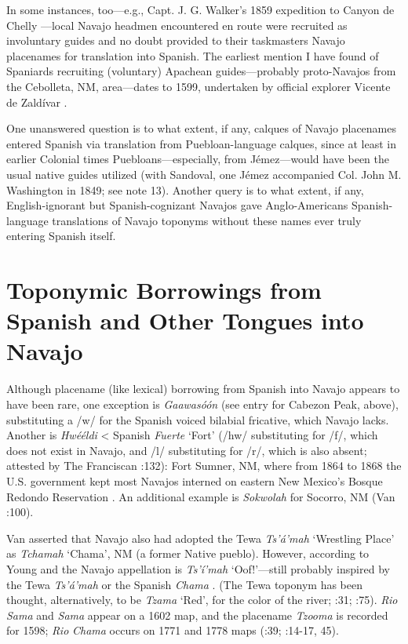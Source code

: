   In some instances, too—e.g., Capt. J. G. Walker’s 1859 expedition to Canyon de Chelly \citep[38]{Bailey1964a}—local Navajo headmen encountered en route were recruited as involuntary guides and no doubt provided to their taskmasters Navajo placenames for translation into Spanish.  The earliest mention I have found of Spaniards recruiting (voluntary) Apachean guides—probably proto-Navajos from the Cebolleta, NM, area—dates to 1599, undertaken by official explorer Vicente de Zaldívar \citep[306]{Reeve1956}.

  One unanswered question is to what extent, if any, calques of Navajo placenames entered Spanish via translation from Puebloan-language calques, since at least in earlier Colonial times Puebloans—especially, from Jémez—would have been the usual native guides utilized (with Sandoval, one Jémez accompanied Col. John M. Washington in 1849; see note 13).  Another query is to what extent, if any, English-ignorant but Spanish-cognizant Navajos gave Anglo-Americans Spanish-language translations of Navajo toponyms without these names ever truly entering Spanish itself.

\section{\textbf{Toponymic} \textbf{Borrowings} \textbf{from} \textbf{Spanish} \textbf{and} \textbf{Other} \textbf{Tongues} \textbf{into} \textbf{Navajo}}

Although placename (like lexical) borrowing from Spanish into Navajo appears to have been rare, one exception is \textit{Gaawasóón} (see entry for Cabezon Peak, above), substituting a /w/ for the Spanish voiced bilabial fricative, which Navajo lacks.  Another is \textit{Hwééldi} < Spanish \textit{Fuerte} ‘Fort’ (/hw/ substituting for /f/, which does not exist in Navajo, and /l/ substituting for /r/, which is also absent; attested by The Franciscan \citealt{Fathers1910}:132): Fort Sumner, NM, where from 1864 to 1868 the U.S. government kept most Navajos interned on eastern New Mexico’s Bosque Redondo Reservation \citep{Bailey1964b}.  An additional example is \textit{Sokwolah} for Socorro, NM (Van \citealt{Valkenburgh1999}:100).  

Van \citet[23]{Valkenburgh1999} asserted that Navajo also had adopted the Tewa \textit{Ts’á’mah} ‘Wrestling Place’ as \textit{Tchamah} ‘Chama’, NM (a former Native pueblo).  However, according to Young and \citet[742]{Morgan1980} the Navajo appellation is \textit{Ts’í’mah} ‘Oof!’—still probably inspired by the Tewa \textit{Ts’á’mah} or the Spanish \textit{Chama} \citep[191]{Linford2000}.  (The Tewa toponym has been thought, alternatively, to be \textit{Tzama} ‘Red’, for the color of the river; \citealt{Pearce1965}:31; \citealt{Julyan1998}:75).  \textit{Rio} \textit{Sama} and \textit{Sama} appear on a 1602 map, and the placename \textit{Tzooma} is recorded for 1598; \textit{Rio} \textit{Chama} occurs on 1771 and 1778 maps (\citealt{Kessell2013}:39; \citealt{Eidenbach2012}:14-17, 45).  

